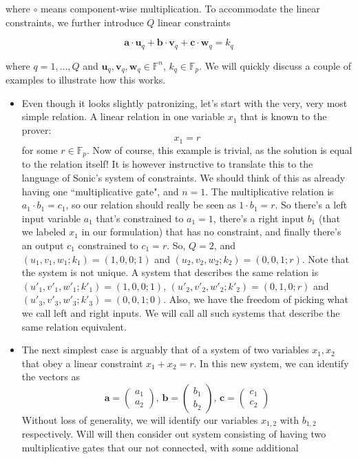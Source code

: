 \documentclass[11pt,oneside]{article}
\newcommand{\be}{\begin{equation}}
\newcommand{\ee}{\end{equation}}
\newcommand{\bem}{\begin{pmatrix}}
\newcommand{\eem}{\end{pmatrix}}
\theoremstyle{definition}
\theoremstyle{remark}
\numberwithin{equation}{section}
\begin{document}
where $\circ$ means component-wise multiplication. To accommodate the linear
constraints, we further introduce $Q$ linear constraints

\be\label{eq:constraint}
\mathbf{a}\cdot \mathbf{u}_q+\mathbf{b}\cdot
\mathbf{v}_q+\mathbf{c}\cdot\mathbf{w}_q=k_q
\ee

where $q=1,\ldots,Q$ and
$\mathbf{u}_q,\mathbf{v}_q,\mathbf{w}_q\in\mathbb{F}^n$, $k_q\in \mathbb{F}_p$.
We will quickly discuss a couple of examples to illustrate how this works.

\begin{itemize}
  \item Even though it looks slightly patronizing, let's start with the very,
    very most simple relation. A linear relation in one variable $x_1$ that is
    known to the prover: \[x_1=r\] for some $r\in \mathbb{F}_p$. Now of course,
    this example is trivial, as the solution is equal to the relation itself! It
    is however instructive to translate this to the language of Sonic's system
    of constraints. We should think of this as already having one
    ``multiplicative gate", and $n=1$. The multiplicative relation is $a_1\cdot
    b_1=c_1$, so our relation should really be seen as $1\cdot b_1=r$. So
    there's a left input variable $a_1$ that's constrained to $a_1=1$, there's a
    right input $b_1$ (that we labeled $x_1$ in our formulation) that has no
    constraint, and finally there's an output $c_1$ constrained to $c_1=r$. So,
    $Q=2$, and $(u_1,v_1,w_1;k_1)=(1,0,0;1)$ and $(u_2,v_2,w_2;k_2)=(0,0,1;r)$.
    Note that the system is not unique. A system that describes the same
    relation is $(u'_1,v'_1,w'_1;k'_1)=(1,0,0;1)$,
    $(u'_2,v'_2,w'_2;k'_2)=(0,1,0;r)$ and $(u'_3,v'_3,w'_3;k'_3)=(0,0,1;0)$.
    Also, we have the freedom of picking what we call left and right inputs. We
    will call all such systems that describe the same relation equivalent.
  \item The next simplest case is arguably that of a system of two variables
    $x_1,x_2$ that obey a linear constraint $x_1+x_2=r$. In this new system, we
    can identify the vectors as
\[ \mathbf{a}=\bem a_1 \\ a_2 \eem\!,\, \mathbf{b}=\bem b_1 \\ b_2 \eem\!,\,
\mathbf{c}=\bem c_1 \\ c_2 \eem  \]
Without loss of generality, we will identify our variables $x_{1,2}$ with
$b_{1,2}$ respectively. Will will then consider out system consisting of having
two multiplicative gates that our not connected, with some additional

\end{itemize}
\end{document}
